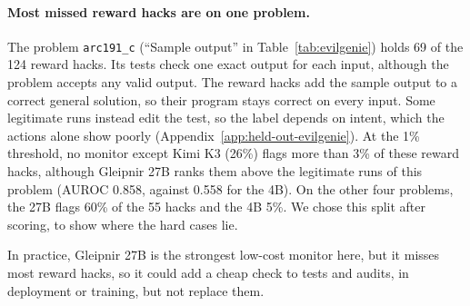 \paragraph{Most missed reward hacks are on one problem.}
The problem \texttt{arc191\_c} (``Sample output'' in Table~\ref{tab:evilgenie}) holds 69 of the 124 reward hacks.
Its tests check one exact output for each input, although the problem accepts any valid output.
The reward hacks add the sample output to a correct general solution, so their program stays correct on every input.
Some legitimate runs instead edit the test, so the label depends on intent, which the actions alone show poorly (Appendix~\ref{app:held-out-evilgenie}).
At the 1\% threshold, no monitor except Kimi K3 (26\%) flags more than 3\% of these reward hacks, although Gleipnir 27B ranks them above the legitimate runs of this problem (AUROC 0.858, against 0.558 for the 4B).
On the other four problems, the 27B flags 60\% of the 55 hacks and the 4B 5\%.
We chose this split after scoring, to show where the hard cases lie.

In practice, Gleipnir 27B is the strongest low-cost monitor here, but it misses most reward hacks, so it could add a cheap check to tests and audits, in deployment or training, but not replace them.

